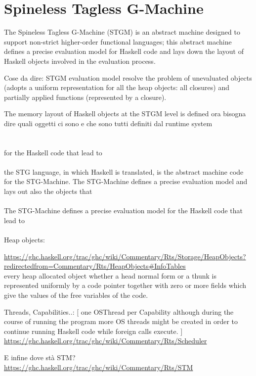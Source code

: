 \section{Spineless Tagless G-Machine}
The Spineless Tagless G-Machine (STGM) is an abstract machine designed to support non-strict higher-order functional languages; this abstract machine defines a precise evaluation model for Haskell code and lays down the layout of Haskell objects involved in the evaluation process. \cite{export:67083}

Cose da dire: STGM evaluation model resolve the problem of unevaluated objects (adopts a uniform representation for all the heap objects: all closures) and partially applied functions (represented by a closure).

The memory layout of Haskell objects at the STGM level is defined 
ora bisogna dire quali oggetti ci sono e che sono tutti definiti dal runtime system\\\\\\





for the Haskell code that lead to \\\\the STG language, in which Haskell is translated, is the abstract machine code for the STG-Machine. 
The STG-Machine defines a precise evaluation model and lays out also the objects that\\\\
The STG-Machine defines a precise evaluation model for the Haskell code that lead to \\\\

Heap objects:

\url{https://ghc.haskell.org/trac/ghc/wiki/Commentary/Rts/Storage/HeapObjects?redirectedfrom=Commentary/Rts/HeapObjects#InfoTables}
\\
every heap allocated object whether a head normal form or a thunk  is represented uniformly by a code pointer together with zero or more fields which give the values of the free variables of the code. \cite{export:67083}

Threads, Capabilities..:
[ one OSThread per Capability although during the course of running the program more OS threads might be created in order to continue running Haskell code while foreign calls execute. ]
\url{https://ghc.haskell.org/trac/ghc/wiki/Commentary/Rts/Scheduler}

E infine dove stà STM?
\url{https://ghc.haskell.org/trac/ghc/wiki/Commentary/Rts/STM}